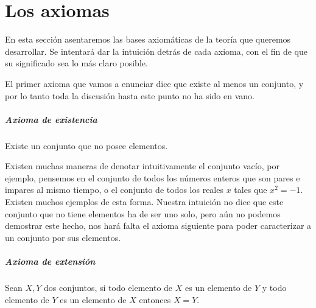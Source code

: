 \chapter{Los axiomas}%
\label{sec:los_axiomas}

En esta sección asentaremos las bases axiomáticas de la
teoría que queremos desarrollar. Se intentará dar la
intuición detrás de cada axioma, con el fin de que su
significado sea lo más claro posible.

El primer axioma que vamos a enunciar dice que existe
al menos un conjunto, y por lo tanto toda la discusión
hasta este punto no ha sido en vano.

\paragraph{Axioma de existencia}%
\label{par:axioma_de_existencia}

Existe un conjunto que no posee elementos.

Existen muchas maneras de denotar intuitivamente el
conjunto vacío, por ejemplo, pensemos en el conjunto de
todos los números enteros que son pares e impares al
mismo tiempo, o el conjunto de todos los reales $x$
tales que $x^{2}=-1$. Existen muchos ejemplos de esta
forma. Nuestra intuición no dice que este conjunto que
no tiene elementos ha de ser uno solo, pero aún no
podemos demostrar este hecho, nos hará falta el axioma
siguiente para poder caracterizar a un conjunto por sus
elementos.

\paragraph{Axioma de extensión}%
\label{par:axioma_de_extensión}

Sean $X,Y$ dos conjuntos, si todo elemento de $X$ es un
elemento de $Y$ y todo elemento de $Y$ es un elemento de
$X$ entonces $X=Y$.

